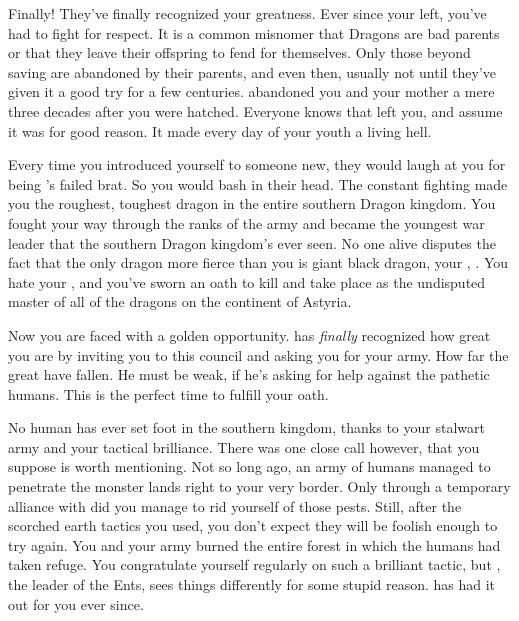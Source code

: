 \documentclass[char]{guildcamp2}
\begin{document}
\name{\cRed{}}

		
Finally! They've finally recognized your greatness. Ever since your \cOnyx{\parent} left, you've had to fight  for respect. It is a common misnomer that Dragons are bad parents or that they leave their offspring to fend for themselves. Only those beyond saving are abandoned by their parents, and even then, usually not until they've given it a good try for a few centuries. \cOnyx{} abandoned you and your mother a mere three decades after you were hatched. Everyone knows that \cOnyx{} left you, and assume it was for good reason. It made every day of your youth a living hell.  
		
Every time you introduced yourself to someone new, they would laugh at you for being \cOnyx{}'s failed brat. So you would bash in their head. The constant fighting made you the roughest, toughest dragon in the entire southern Dragon kingdom. You fought your way through the ranks of the army and became the youngest war leader that the southern Dragon kingdom's ever seen. No one alive disputes the fact that the only dragon more fierce than you is giant black dragon, your \cOnyx{\parent}, \cOnyx{}. You hate your \cOnyx{\parent}, and you've sworn an oath to kill \cOnyx{\them} and take \cOnyx{\their} place as the undisputed master of all of the dragons on the continent of Astyria.

Now you are faced with a golden opportunity. \cOnyx{} has \emph{finally} recognized how great you are by inviting you to this council and asking you for your army. How far the great have fallen. He must be weak, if he's asking for help against the pathetic humans. This is the perfect time to fulfill your oath.

No human has ever set foot in the southern kingdom, thanks to your stalwart army and your tactical brilliance. There was one close call however, that you suppose is worth mentioning. Not so long ago, an army of humans managed to penetrate the monster lands right to your very border. Only through a temporary alliance with \cLich{\full} did you manage to rid yourself of those pests. Still, after the scorched earth tactics you used, you don't expect they will be foolish enough to try again. You and your army burned the entire forest in which the humans had taken refuge. You congratulate yourself regularly on such a brilliant tactic, but \cEnt{\full}, the leader of the Ents, sees things differently for some stupid reason. \cEnt{\They} has had it out for you ever since.
\end{document}
